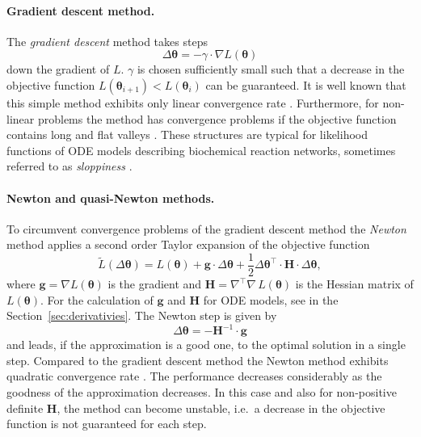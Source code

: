 \documentclass[12pt,a4paper]{scrartcl}
\begin{document}
\paragraph{Gradient descent method.}
The \emph{gradient descent} method takes steps 
\begin{equation}
	\Delta \boldsymbol{\theta} = - \gamma \cdot \nabla L(\boldsymbol{\theta}) 
\label{gradientstep}
\end{equation}	
down the gradient of $L$. $\gamma$ is chosen sufficiently small such that a decrease in 
the objective function $L(\boldsymbol{\theta}_{i+1}) < L(\boldsymbol{\theta}_{i})$ can be 
guaranteed. It is well known that this simple method exhibits only linear convergence rate 
\citep{Stoer:2005fk}. Furthermore, for non-linear problems the method has convergence 
problems if the objective function contains long and flat valleys \citep{Rosenbrock:1960fk}. 
These structures are typical for likelihood functions of ODE models describing biochemical 
reaction networks, sometimes referred to as \emph{sloppiness} \citep{Gutenkunst:2007ct}. 

\paragraph{Newton and quasi-Newton methods.}
To circumvent convergence problems of the gradient descent method the \emph{Newton} 
method applies a second order Taylor expansion of the objective function
\begin{equation}
	\tilde L(\Delta \boldsymbol{\theta}) = L(\boldsymbol{\theta}) + \mathbf{g} \cdot \Delta 
\boldsymbol{\theta} + \frac{1}{2} \Delta \boldsymbol{\theta}^\top \cdot \mathbf{H} \cdot 
\Delta \boldsymbol{\theta}, \label{2taylor}
\end{equation}
where $\mathbf{g} = \nabla L(\boldsymbol{\theta})$ is the gradient and $\mathbf{H} = 
\nabla^\top\nabla\, L(\boldsymbol{\theta})$ is the Hessian matrix of $L(\boldsymbol{\theta})
$. For the calculation of $\mathbf{g}$ and $\mathbf{H}$ for ODE models, see in the 
Section~\ref{sec:derivativies}. The Newton step is given by 
\begin{equation}
	\Delta \boldsymbol{\theta} = -\mathbf{H}^{-1} \cdot \mathbf{g} \label{newtonstep}
\end{equation}
and leads, if the approximation is a good one, to the optimal solution in a single step. 
Compared to the gradient descent method the Newton method exhibits quadratic 
convergence rate \citep{Stoer:2005fk}. The performance decreases considerably as the 
goodness of the approximation decreases. In this case and also for non-positive definite $
\mathbf{H}$, the method can become unstable, i.e.~a decrease in the objective function is 
not guaranteed for each step. 
\end{document}

